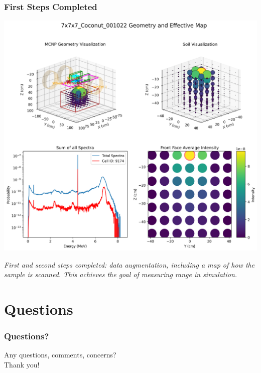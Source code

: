 \documentclass[notheorems,11pt,compress]{beamer}
\begin{document}
\begin{frame}
\frametitle{First Steps Completed}
\begin{center}
\includegraphics[width=0.7\linewidth]{detectorrange.png}
\end{center}
\small
\textit{First and second steps completed: data augmentation, including a map of how the sample is scanned. This achieves the goal of measuring range in simulation.}
\end{frame}

\section*{Questions}

\begin{frame}
\frametitle{Questions?}
\begin{center}
\LARGE{Any questions, comments, concerns?}\\[2em]
\Huge{\textcolor[RGB]{255,0,0}{Thank you!}}
\end{center}
\end{frame}
\end{document}
